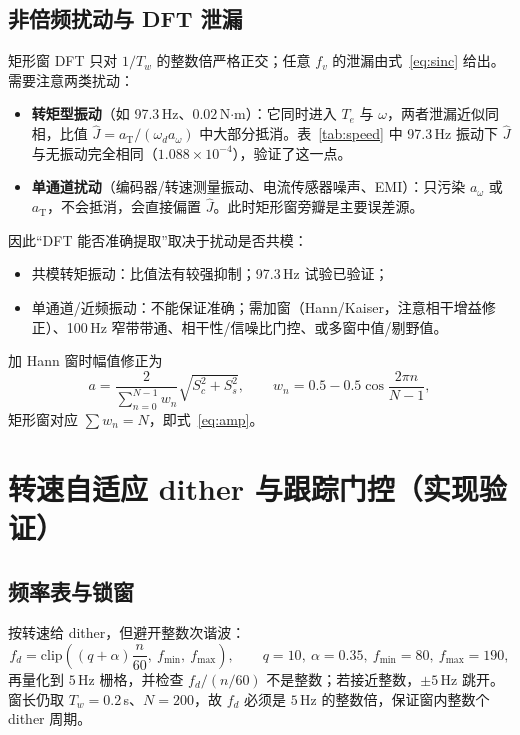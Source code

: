 \documentclass[11pt,a4paper]{article}
\newcommand{\Jhat}{\hat J}
\newcommand{\Te}{T_e}
\begin{document}
\subsection{非倍频扰动与 DFT 泄漏}

矩形窗 DFT 只对 $1/T_w$ 的整数倍严格正交；任意 $f_v$ 的泄漏由式~\eqref{eq:sinc} 给出。需要注意两类扰动：

\begin{itemize}
  \item \textbf{转矩型振动}（如 97.3\,Hz、$0.02$\,N$\cdot$m）：它同时进入 $\Te$ 与 $\omega$，两者泄漏近似同相，比值 $\Jhat=a_{\mathrm{T}}/(\omega_da_{\omega})$ 中大部分抵消。表~\ref{tab:speed} 中 97.3\,Hz 振动下 $\Jhat$ 与无振动完全相同（$1.088\times10^{-4}$），验证了这一点。
  \item \textbf{单通道扰动}（编码器/转速测量振动、电流传感器噪声、EMI）：只污染 $a_{\omega}$ 或 $a_{\mathrm{T}}$，不会抵消，会直接偏置 $\Jhat$。此时矩形窗旁瓣是主要误差源。
\end{itemize}

因此“DFT 能否准确提取”取决于扰动是否共模：
\begin{itemize}
  \item 共模转矩振动：比值法有较强抑制；97.3\,Hz 试验已验证；
  \item 单通道/近频振动：不能保证准确；需加窗（Hann/Kaiser，注意相干增益修正）、100\,Hz 窄带带通、相干性/信噪比门控、或多窗中值/剔野值。
\end{itemize}

加 Hann 窗时幅值修正为
\begin{equation}
a=\frac{2}{\sum_{n=0}^{N-1}w_n}\sqrt{S_c^2+S_s^2},
\qquad
w_n=0.5-0.5\cos\frac{2\pi n}{N-1},
\label{eq:hann}
\end{equation}
矩形窗对应 $\sum w_n=N$，即式~\eqref{eq:amp}。


\section{转速自适应 dither 与跟踪门控（实现验证）}

\subsection{频率表与锁窗}

按转速给 dither，但避开整数次谐波：
\begin{equation}
f_d=\mathrm{clip}\left((q+\alpha)\frac{n}{60},\ f_{\min},\ f_{\max}\right),
\qquad q=10,\ \alpha=0.35,\ f_{\min}=80,\ f_{\max}=190,
\label{eq:fdtable}
\end{equation}
再量化到 $5$\,Hz 栅格，并检查 $f_d/(n/60)$ 不是整数；若接近整数，$\pm5$\,Hz 跳开。窗长仍取 $T_w=0.2$\,s、$N=200$，故 $f_d$ 必须是 $5$\,Hz 的整数倍，保证窗内整数个 dither 周期。
\end{document}
